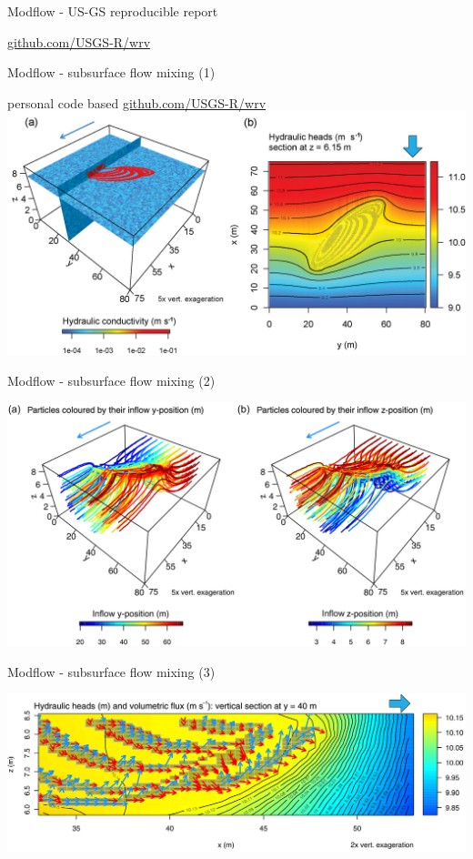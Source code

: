 \documentclass[8pt,ignorenonframetext,]{beamer}
\begin{document}
\begin{frame}{Modflow - US-GS reproducible report}

\href{https://github.com/USGS-R/wrv}{github.com/USGS-R/wrv}

\end{frame}

\begin{frame}{Modflow - subsurface flow mixing (1)}

personal code based
\href{https://github.com/USGS-R/wrv}{github.com/USGS-R/wrv}
\includegraphics{imgPres/RMODFLOW_head.png}

\end{frame}

\begin{frame}{Modflow - subsurface flow mixing (2)}

\includegraphics{imgPres/RMODFLOW_particles.png}

\end{frame}

\begin{frame}{Modflow - subsurface flow mixing (3)}

\includegraphics{imgPres/RMODFLOW_zoom.png}

\end{frame}
\end{document}

